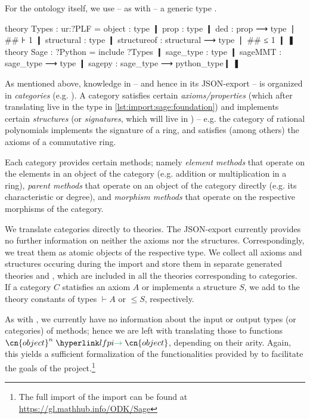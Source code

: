 For the ontology itself, we use -- as with \GAP -- a generic type .

\begin{mmtcode}[caption= {The \Sage Foundational Ontology in \mmt\protect\footnotemark},label=lst:import:sage:foundation]
theory Types : ur:?PLF =
  object : type ❙
  prop : type ❙
  ded : prop ⟶ type ❘ ## ⊦ 1 ❙
  structural : type ❙
  structureof : structural ⟶ type ❘ ## ≤ 1 ❙
❚
theory Sage : ?Python = 
  include ?Types ❙
  sage_type : type ❙
  sageMMT   : sage_type ⟶ type ❙
  sagepy    : sage_type ⟶ python_type❙
❚ 
\end{mmtcode}

As mentioned above, knowledge in \Sage -- and hence in its JSON-export -- is organized in \emph{categories} (e.g. ). A category satisfies certain \emph{axioms/properties} (which after translating live in the type  in \autoref{lst:import:sage:foundation}) and implements certain \emph{structures} (or \emph{signatures}, which will live in ) -- e.g. the category of rational polynomials implements the signature of a ring, and satisfies (among others) the axioms of a commutative ring.

Each category provides certain methods; namely \emph{element methods} that operate on the elements in an object of the category (e.g. addition or multiplication in a ring), \emph{parent methods} that operate on an object of the category directly (e.g. its characteristic or degree), and \emph{morphism methods} that operate on the respective morphisms of the category.\medskip

We translate categories directly to \ommt theories. The JSON-export currently provides no further information on neither the axioms nor the structures. Correspondingly, we treat them as atomic objects of the respective type. We collect all axioms and structures occuring during the import and store them in separate generated theories  and , which are included in all the theories corresponding to categories. If a category $C$ statisfies an axiom $A$ or implements a structure $S$, we add to the theory constants of types $\vdash A$ or $\leq S$, respectively.

As with \GAP, we currently have no information about the input or output types (or categories) of methods; hence we are left with translating those to functions $\lfarrow{\cn{object}^n}{\cn{object}}$, depending on their arity. Again, this yields a sufficient formalization of the functionalities provided by \Sage to facilitate the goals of the \ODK project.\footnote{The full import of the \Sage import can be found at \url{https://gl.mathhub.info/ODK/Sage}}
